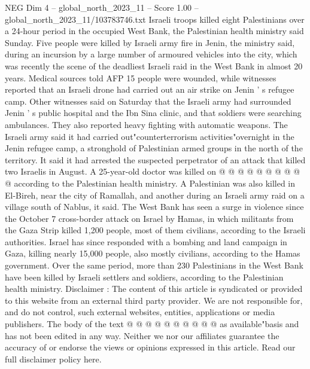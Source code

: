 \begin{textsample}{NEG Dim 4 – global\_north\_2023\_11 – Score 1.00 – global\_north\_2023\_11/103783746.txt}  \label{ex:f4_neg_259}
Israeli troops killed eight Palestinians over a 24-hour period in the occupied West Bank, the Palestinian health ministry said Sunday.
Five people were killed by Israeli army fire in Jenin, the ministry said, during an incursion by a large number of armoured vehicles into the city, which was recently the scene of the deadliest Israeli raid in the West Bank in almost 20 years.
Medical sources told AFP 15 people were wounded, while witnesses reported that an Israeli drone had carried out an air strike on Jenin ' s refugee camp.
Other witnesses said on Saturday that the Israeli army had surrounded Jenin ' s public hospital and the Ibn Sina clinic, and that soldiers were searching ambulances.
They also reported heavy fighting with automatic weapons.
The Israeli army said it had carried out"counterterrorism activities"overnight in the Jenin refugee camp, a stronghold of Palestinian armed groups in the north of the territory.
It said it had arrested the suspected perpetrator of an attack that killed two Israelis in August.
A 25-year-old doctor was killed on @ @ @ @ @ @ @ @ @ @ according to the Palestinian health ministry.
A Palestinian was also killed in El-Bireh, near the city of Ramallah, and another during an Israeli army raid on a village south of Nablus, it said.
The West Bank has seen a surge in violence since the October 7 cross-border attack on Israel by Hamas, in which militants from the Gaza Strip killed 1,200 people, most of them civilians, according to the Israeli authorities.
Israel has since responded with a bombing and land campaign in Gaza, killing nearly 15,000 people, also mostly civilians, according to the Hamas government.
Over the same period, more than 230 Palestinians in the West Bank have been killed by Israeli settlers and soldiers, according to the Palestinian health ministry.
Disclaimer : The content of this article is syndicated or provided to this website from an external third party provider.
We are not responsible for, and do not control, such external websites, entities, applications or media publishers.
The body of the text @ @ @ @ @ @ @ @ @ @ as available"basis and has not been edited in any way.
Neither we nor our affiliates guarantee the accuracy of or endorse the views or opinions expressed in this article.
Read our full disclaimer policy here.

\end{textsample}
